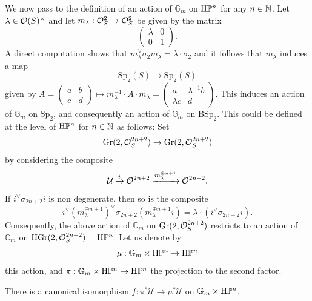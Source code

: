 \begin{num}
We now pass to the definition of an action of $\mathbb{G}_m$ on $\mathrm{H}\mathbb P^n$ for any $n\in\mathbb{N}$. Let $\lambda\in \mathcal O(S)^\times$ and let $m_\lambda:\mathcal O_S^2\to \mathcal O_S^2$ be given by the matrix
\[
\begin{pmatrix} \lambda & 0 \\ 0 & 1\end{pmatrix}.
\]
A direct computation shows that $m_\lambda^\vee \sigma_2 m_\lambda=\lambda\cdot \sigma_2$ and it follows that $m_{\lambda}$ induces a map
\[
\mathrm{Sp}_2(S)\to \mathrm{Sp}_2(S)
\]
given by $A=\begin{pmatrix} a & b \\ c & d\end{pmatrix}\mapsto m_{\lambda}^{-1}\cdot A\cdot m_{\lambda}=\begin{pmatrix} a & \lambda^{-1}b \\ \lambda c & d \end{pmatrix}$.
This induces an action of $\mathbb{G}_m$ on $\mathrm{Sp}_2$, and consequently an action of $\mathbb{G}_m$ on $\mathrm{BSp}_2$. This could be defined at the level of $\mathrm{H}\mathbb P^n$ for $n\in\mathbb{N}$ as follows: Set
\[
\mathrm{Gr}(2,\mathcal O_S^{2n+2})\to \mathrm{Gr}(2,\mathcal O_S^{2n+2})
\]
by considering the composite 
\[
\mathcal{U}\xrightarrow{i} \mathcal O^{2n+2}\xrightarrow{m_{\lambda}^{\oplus n+1}} \mathcal O^{2n+2}.
\]
If $i^\vee \sigma_{2n+2} i$ is non degenerate, then so is the composite 
\[
i^\vee (m_{\lambda}^{\oplus n+1})^\vee \sigma_{2n+2} (m_{\lambda}^{\oplus n+1}i)=\lambda\cdot  (i^\vee \sigma_{2n+2} i).
\]
Consequently, the above action of $\mathbb{G}_m$ on $\mathrm{Gr}(2,\mathcal O_S^{2n+2})$ restricts to an action of $\mathbb{G}_m$ on $\mathrm{HGr}(2,\mathcal O_S^{2n+2})=\mathrm{H}\mathbb P^{n}$. Let us denote by 
\[
\mu:\mathbb{G}_m\times \mathrm{H}\mathbb P^{n} \to \mathrm{H}\mathbb P^{n}
\]
this action, and $\pi:\mathbb{G}_m\times \mathrm{H}\mathbb P^{n}\to \mathrm{H}\mathbb P^{n}$ the projection to the second factor.

\begin{lm}
There is a canonical isomorphism $f:\pi^*\mathcal{U}\to \mu^*\mathcal{U}$ on $\mathbb{G}_m\times \mathrm{H}\mathbb P^{n}$.
\end{lm}


\end{num}
